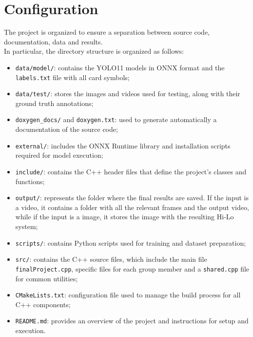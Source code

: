 \section{Configuration}
The project is organized to ensure a separation between source code, documentation, data and results.\\
In particular, the directory structure is organized as follows:
\begin{itemize}
    \item \texttt{data/model/}: contains the YOLO11 models in ONNX format and the \texttt{labels.txt} file with all card symbols;
    \item \texttt{data/test/}: stores the images and videos used for testing, along with their ground truth annotations;
    \item \texttt{doxygen\_docs/} and \texttt{doxygen.txt}: used to generate automatically a documentation of the source code;
    \item \texttt{external/}: includes the ONNX Runtime library and installation scripts required for model execution;
    \item \texttt{include/}: contains the C++ header files that define the project's classes and functions;
    \item \texttt{output/}: represents the folder where the final results are saved. If the input is a video, it contains a folder with all the relevant frames and the output video, while if the input is a image, it stores the image with the resulting Hi-Lo system;
    \item \texttt{scripts/}: contains Python scripts used for training and dataset preparation;
    \item \texttt{src/}: contains the C++ source files, which include the main file \texttt{finalProject.cpp}, specific files for each group member and a \texttt{shared.cpp} file for common utilities;
    \item \texttt{CMakeLists.txt}: configuration file used to manage the build process for all C++ components;
    \item \texttt{README.md}: provides an overview of the project and instructions for setup and execution.
\end{itemize}